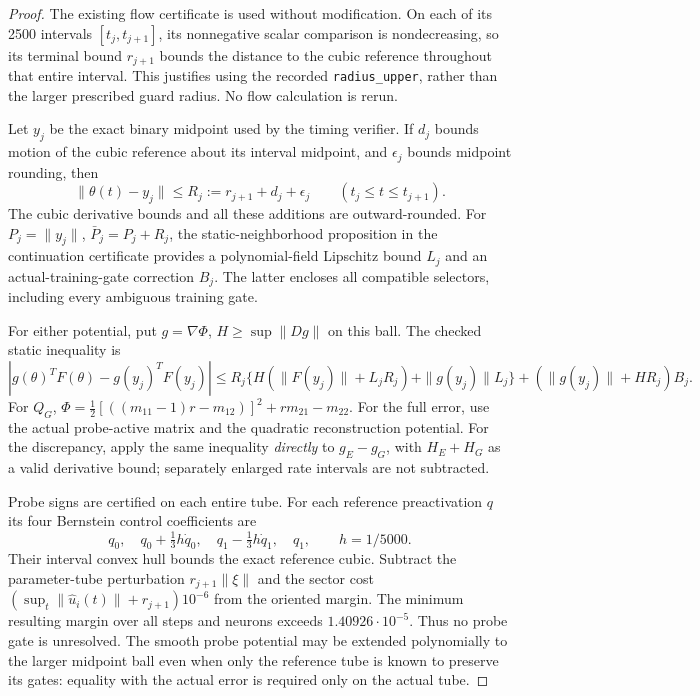 \documentclass[10pt]{article}
\begin{document}
\begin{proof}
The existing flow certificate is used without modification. On each of its
2500 intervals $[t_j,t_{j+1}]$, its nonnegative scalar comparison is
nondecreasing, so its terminal bound $r_{j+1}$ bounds the distance to the
cubic reference throughout that entire interval. This justifies using the
recorded \texttt{radius\_upper}, rather than the larger prescribed guard
radius. No flow calculation is rerun.

Let $y_j$ be the exact binary midpoint used by the timing verifier. If
$d_j$ bounds motion of the cubic reference about its interval midpoint,
and $\epsilon_j$ bounds midpoint rounding, then
\[
 \|\theta(t)-y_j\|\le R_j:=r_{j+1}+d_j+\epsilon_j
 \qquad(t_j\le t\le t_{j+1}).
\]
The cubic derivative bounds and all these additions are outward-rounded.
For $P_j=\|y_j\|$, $\bar P_j=P_j+R_j$, the static-neighborhood proposition
in the continuation certificate provides a polynomial-field Lipschitz bound
$L_j$ and an actual-training-gate correction $B_j$. The latter encloses
all compatible selectors, including every ambiguous training gate.

For either potential, put $g=\nabla\Phi$, $H\ge\sup\|Dg\|$ on this ball.
The checked static inequality is
\[
 |g(\theta)^TF(\theta)-g(y_j)^TF(y_j)|
 \le R_j\{H(\|F(y_j)\|+L_jR_j)+\|g(y_j)\|L_j\}
       +(\|g(y_j)\|+HR_j)B_j.
\]
For $Q_G$, $\Phi=\tfrac12[((m_{11}-1)r-m_{12})]^2+rm_{21}-m_{22}$.
For the full error, use the actual probe-active matrix and the quadratic
reconstruction potential. For the discrepancy, apply the same inequality
\emph{directly} to $g_E-g_G$, with $H_E+H_G$ as a valid derivative bound;
separately enlarged rate intervals are not subtracted.

Probe signs are certified on each entire tube. For each reference
preactivation $q$ its four Bernstein control coefficients are
\[
 q_0,\quad q_0+\tfrac{1}{3}h\dot q_0,\quad
 q_1-\tfrac{1}{3}h\dot q_1,\quad q_1,\qquad h=1/5000.
\]
Their interval convex hull bounds the exact reference cubic. Subtract the
parameter-tube perturbation $r_{j+1}\|\xi\|$ and the sector cost
$(\sup_t\|\widehat u_i(t)\|+r_{j+1})10^{-6}$ from the oriented margin.
The minimum resulting margin over all steps and neurons exceeds
$1.40926\cdot10^{-5}$. Thus no probe gate is unresolved. The smooth probe
potential may be extended polynomially to the larger midpoint ball even
when only the reference tube is known to preserve its gates: equality with
the actual error is required only on the actual tube.


\end{proof}
\end{document}
